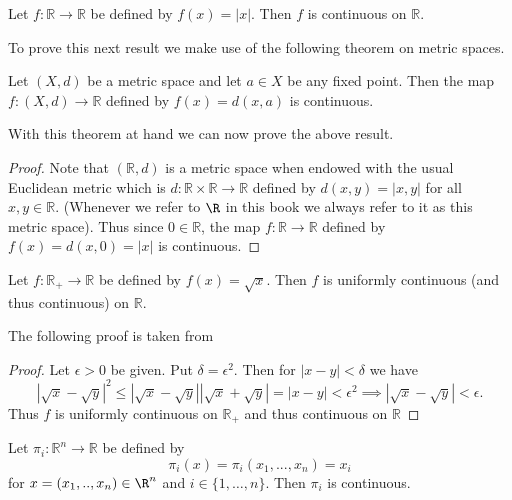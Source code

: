 	 \hrulefill
	 
	  \begin{result}
	  	Let $f : \mathbb{R} \to \mathbb{R}$ be defined by $f(x) = |x|$. Then $f$ is continuous on $\mathbb{R}$. 
	  \end{result}
	  
	  To prove this next result we make use of the following theorem on metric spaces.
	 
	 \begin{theorem}
	 	Let $(X, d)$ be a metric space and let $a \in X$ be any fixed point. Then the map $f : (X, d) \to \mathbb{R}$ defined by $f(x) = d(x, a)$ is continuous.
	 \end{theorem}
	 
	 With this theorem at hand we can now prove the above result.
	 
	 \begin{proof}
	 	Note that $(\mathbb{R}, d)$ is a metric space when endowed with the usual Euclidean metric which is $d : \mathbb{R} \times \mathbb{R} \to \mathbb{R}$ defined by $d(x, y) = |x, y|$ for all $x, y \in \mathbb{R}$. (Whenever we refer to $\R$ in this book we always refer to it as this metric space). Thus since $0 \in \mathbb{R}$, the map $f : \mathbb{R} \to \mathbb{R}$ defined by $f(x) = d(x, 0) = |x|$ is continuous.
	 \end{proof}
	 
	 	 \hrulefill
	 	 
	 	 \medskip
	 	 
	 \begin{result}
	 		Let $f : \mathbb{R_{+}} \to \mathbb{R}$ be defined by $f(x) = \sqrt{x}$. Then $f$ is uniformly continuous (and thus continuous) on $\mathbb{R}$. 
	 \end{result}
	 
	 The following proof is taken from \cite{sqrtx}
	 
	 \begin{proof}
	 	Let $\epsilon > 0$ be given. Put $\delta = \epsilon^2$. Then for $|x-y| < \delta$ we have  $$|\sqrt x - \sqrt y|^2 \leq |\sqrt x - \sqrt y||\sqrt x + \sqrt y| = |x-y| < \epsilon^2 \implies |\sqrt x - \sqrt y| < \epsilon. $$ Thus $f$ is uniformly continuous on $\mathbb{R}_{+}$ and thus continuous on $\mathbb{R}$
	 \end{proof}

	 
	 \begin{result}
	 	Let $\pi_i : \mathbb{R}^n \to \mathbb{R}$ be defined by $$\pi_i(x) = \pi_i(x_1, ..., x_n) = x_i$$ for $x = (x_1, .., x_n) \in \R^n$ and $i \in \{1, \dots, n\}$. Then $\pi_i$ is continuous.
	 \end{result}
	 
